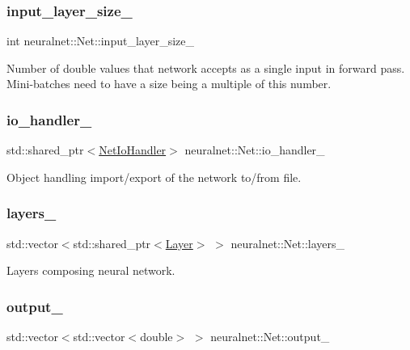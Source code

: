 \subsubsection{\texorpdfstring{input\+\_\+layer\+\_\+size\+\_\+}{input\_layer\_size\_}}
{\footnotesize\ttfamily int neuralnet\+::\+Net\+::input\+\_\+layer\+\_\+size\+\_\+\hspace{0.3cm}{\ttfamily [protected]}}

Number of double values that network accepts as a single input in forward pass. Mini-\/batches need to have a size being a multiple of this number. \mbox{\label{classneuralnet_1_1Net_a667dea73a52e84a82f7fff1da84cb9b7}} 
\subsubsection{\texorpdfstring{io\+\_\+handler\+\_\+}{io\_handler\_}}
{\footnotesize\ttfamily std\+::shared\+\_\+ptr$<$\hyperlink{classneuralnet_1_1NetIoHandler}{Net\+Io\+Handler}$>$ neuralnet\+::\+Net\+::io\+\_\+handler\+\_\+\hspace{0.3cm}{\ttfamily [protected]}}

Object handling import/export of the network to/from file. \mbox{\label{classneuralnet_1_1Net_a4aa4d82f8323fccb58eccb06a52bf0bf}} 
\subsubsection{\texorpdfstring{layers\+\_\+}{layers\_}}
{\footnotesize\ttfamily std\+::vector$<$std\+::shared\+\_\+ptr$<$\hyperlink{classneuralnet_1_1Layer}{Layer}$>$ $>$ neuralnet\+::\+Net\+::layers\+\_\+\hspace{0.3cm}{\ttfamily [protected]}}

Layers composing neural network. \mbox{\label{classneuralnet_1_1Net_a477cc97557f82094b4787b7ebddaaf7f}} 
\subsubsection{\texorpdfstring{output\+\_\+}{output\_}}
{\footnotesize\ttfamily std\+::vector$<$std\+::vector$<$double$>$ $>$ neuralnet\+::\+Net\+::output\+\_\+\hspace{0.3cm}{\ttfamily [protected]}}

